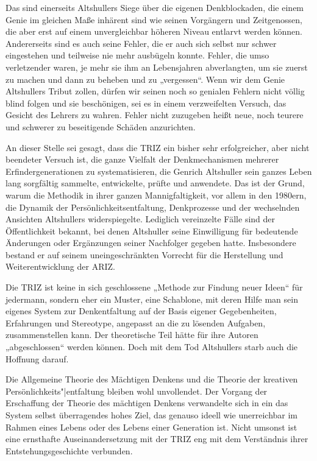 \documentclass[11pt,a4paper]{article}
\begin{document}
Das sind einerseits Altshullers Siege über die eigenen Denkblockaden, die
einem Genie im gleichen Maße inhärent sind wie seinen Vorgängern und
Zeitgenossen, die aber erst auf einem unvergleichbar höheren Niveau entlarvt
werden können. Andererseits sind es auch seine Fehler, die er auch sich selbst
nur schwer eingestehen und teilweise nie mehr ausbügeln konnte. Fehler, die
umso verletzender waren, je mehr sie ihm an Lebensjahren abverlangten, um sie
zuerst zu machen und dann zu beheben und zu „vergessen“. Wenn wir dem Genie
Altshullers Tribut zollen, dürfen wir seinen noch so genialen Fehlern nicht
völlig blind folgen und sie beschönigen, sei es in einem verzweifelten
Versuch, das Gesicht des Lehrers zu wahren. Fehler nicht zuzugeben heißt neue,
noch teurere und schwerer zu beseitigende Schäden anzurichten.

An dieser Stelle sei gesagt, dass die TRIZ ein bisher sehr erfolgreicher, aber
nicht beendeter Versuch ist, die ganze Vielfalt der Denkmechanismen mehrerer
Erfindergenerationen zu systematisieren, die Genrich Altshuller sein ganzes
Leben lang sorgfältig sammelte, entwickelte, prüfte und anwendete. Das ist der
Grund, warum die Methodik in ihrer ganzen Mannigfaltigkeit, vor allem in den
1980ern, die Dynamik der Persönlichkeitsentfaltung, Denkprozesse und der
wechselnden Ansichten Altshullers widerspiegelte. Lediglich vereinzelte Fälle
sind der Öffentlichkeit bekannt, bei denen Altshuller seine Einwilligung für
bedeutende Änderungen oder Ergänzungen seiner Nachfolger gegeben hatte.
Insbesondere bestand er auf seinem uneingeschränkten Vorrecht für die
Herstellung und Weiterentwicklung der ARIZ.

Die TRIZ ist keine in sich geschlossene „Methode zur Findung neuer Ideen“ für
jedermann, sondern eher ein Muster, eine Schablone, mit deren Hilfe man sein
eigenes System zur Denkentfaltung auf der Basis eigener Gegebenheiten,
Erfahrungen und Stereotype, angepasst an die zu lösenden Aufgaben,
zusammenstellen kann. Der theoretische Teil hätte für ihre Autoren
„abgeschlossen“ werden können. Doch mit dem Tod Altshullers starb auch die
Hoffnung darauf.

Die Allgemeine Theorie des Mächtigen Denkens und die Theorie der kreativen
Persönlichkeits"|entfaltung bleiben wohl unvollendet. Der Vorgang der
Erschaffung der Theorie des mächtigen Denkens verwandelte sich in ein das
System selbst überragendes hohes Ziel, das genauso ideell wie unerreichbar im
Rahmen eines Lebens oder des Lebens einer Generation ist.  Nicht umsonst ist
eine ernsthafte Auseinandersetzung mit der TRIZ eng mit dem Verständnis ihrer
Entstehungsgeschichte verbunden.
\end{document}
